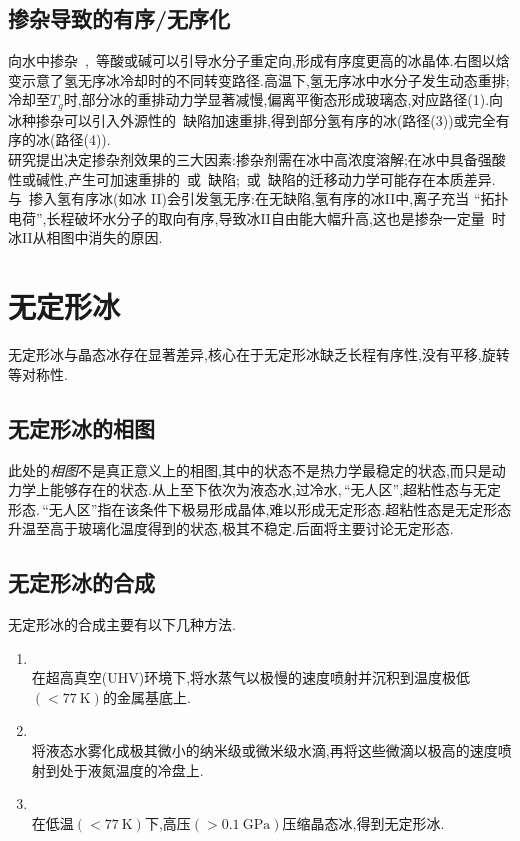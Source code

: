 \documentclass{ctexart}
\begin{document}
\subsection{掺杂导致的有序/无序化}
向水中掺杂~,~等酸或碱可以引导水分子重定向,形成有序度更高的冰晶体.右图以焓变示意了氢无序冰冷却时的不同转变路径.高温下,氢无序冰中水分子发生动态重排;冷却至$T_g$时,部分冰的重排动力学显著减慢,偏离平衡态形成玻璃态,对应路径(1).向冰种掺杂可以引入外源性的~缺陷加速重排,得到部分氢有序的冰(路径(3))或完全有序的冰(路径(4)).\\
\indent 研究提出决定掺杂剂效果的三大因素:掺杂剂需在冰中高浓度溶解;在冰中具备强酸性或碱性,产生可加速重排的~或~缺陷;~或~缺陷的迁移动力学可能存在本质差异.\\
\indent {}与~掺入氢有序冰(如冰 II)会引发氢无序:在无缺陷,氢有序的冰II中,离子充当 ``拓扑电荷'',长程破坏水分子的取向有序,导致冰II自由能大幅升高,这也是掺杂一定量~时冰II从相图中消失的原因.
\section{无定形冰\cite{Loerting2011}}
无定形冰与晶态冰存在显著差异,核心在于无定形冰缺乏长程有序性,没有平移,旋转等对称性.
\subsection{无定形冰的相图}
此处的\textit{相图}不是真正意义上的相图,其中的状态不是热力学最稳定的状态,而只是动力学上能够存在的状态.从上至下依次为液态水,过冷水,\,``无人区'',超粘性态与无定形态.\,``无人区''指在该条件下极易形成晶体,难以形成无定形态.超粘性态是无定形态升温至高于玻璃化温度得到的状态,极其不稳定.后面将主要讨论无定形态.
\subsection{无定形冰的合成}
无定形冰的合成主要有以下几种方法.
\begin{enumerate}
    \item {}\\
    在超高真空(UHV)环境下,将水蒸气以极慢的速度喷射并沉积到温度极低$(<\SI{77}{\kelvin})$的金属基底上.
    \item {}\\
    将液态水雾化成极其微小的纳米级或微米级水滴,再将这些微滴以极高的速度喷射到处于液氮温度的冷盘上.
    \item {}\\
    在低温$(<\SI{77}{\kelvin})$下,高压$(>\SI{0.1}{\giga\pascal})$压缩晶态冰,得到无定形冰.
\end{enumerate}
\end{document}
